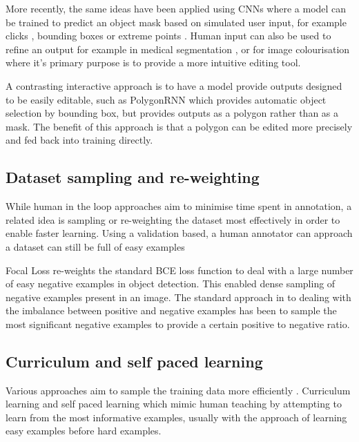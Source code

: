 More recently, the same ideas have been applied using \gls{CNN}s where a model can be trained to predict an object mask based on simulated user input, for example clicks \cite{Xu2016b, Boroujerdi2017}, bounding boxes \cite {Xu2017a} or extreme points \cite{Maninis2017}. Human input can also be used to refine an output for example in medical segmentation \cite{Wang2017}, or for image colourisation \cite{Zhang} where it's primary purpose is to provide a more intuitive editing tool.

A contrasting interactive approach is to have a model provide outputs designed to be easily editable, such as PolygonRNN \cite{Castrejon2017} which provides automatic object selection by bounding box, but provides outputs as a polygon rather than as a mask. The benefit of this approach is that a polygon can be edited more precisely and fed back into training directly.


\subsection{Dataset sampling and re-weighting}
 
 
While human in the loop approaches aim to minimise time spent in annotation, a related idea is sampling or re-weighting the dataset most effectively in order to enable faster learning. Using a validation based, a human annotator can  approach a dataset can still be full of easy examples

Focal Loss \cite{Lin2017} re-weights the standard \gls{BCE} loss function to deal with a large number of easy negative examples in object detection. This enabled dense sampling of negative examples present in an image. The standard approach in to dealing with the imbalance between positive and negative examples has been to sample the most significant negative examples to provide a certain positive to negative ratio.
 
\subsection{Curriculum and self paced learning}


Various approaches aim to sample the training data more efficiently \cite{Loshchilov, Katharopoulos2018}. Curriculum learning and self paced learning which mimic human teaching by attempting to learn from the most informative examples, usually with the approach of learning easy examples before hard examples. 


